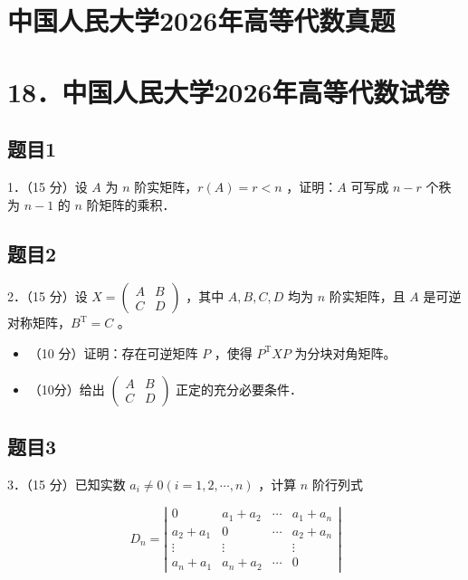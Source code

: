 \documentclass{article}
\begin{document}
\section*{中国人民大学2026年高等代数真题}
\section*{18．中国人民大学2026年高等代数试卷}

\subsection{题目1}
1．（15 分）设 \(A\) 为 \(n\) 阶实矩阵，\(r(A)=r<n\) ，证明：\(A\) 可写成 \(n-r\) 个秩为 \(n-1\) 的 \(n\) 阶矩阵的乘积．

\subsection{题目2}
2．（15 分）设 \(X=\left(\begin{array}{ll}A & B \\ C & D\end{array}\right)\) ，其中 \(A, B, C, D\) 均为 \(n\) 阶实矩阵，且 \(A\) 是可逆对称矩阵，\(B^{\mathrm{T}}=C\) 。

\begin{itemize}
  \item[（1）] （10 分）证明：存在可逆矩阵 \(P\) ，使得 \(P^{\mathrm{T}} X P\) 为分块对角矩阵。
  \item[（2）] （10分）给出 \(\left(\begin{array}{cc}A & B \\ C & D\end{array}\right)\) 正定的充分必要条件．
\end{itemize}

\subsection{题目3}
3．（15 分）已知实数 \(a_{i} \neq 0(i=1,2, \cdots, n)\) ，计算 \(n\) 阶行列式

\[
D_{n}=\left|\begin{array}{cccc}
0 & a_{1}+a_{2} & \cdots & a_{1}+a_{n} \\
a_{2}+a_{1} & 0 & \cdots & a_{2}+a_{n} \\
\vdots & \vdots & & \vdots \\
a_{n}+a_{1} & a_{n}+a_{2} & \cdots & 0
\end{array}\right|
\]
\end{document}
